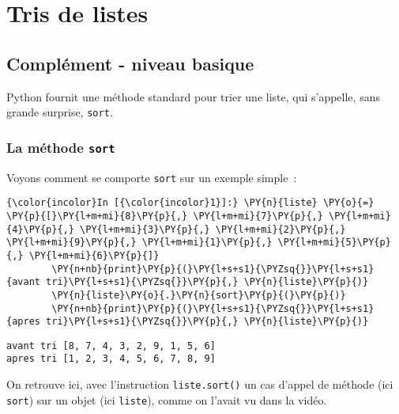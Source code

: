     \hypertarget{tris-de-listes}{%
\section{Tris de listes}\label{tris-de-listes}}

    \hypertarget{compluxe9ment---niveau-basique}{%
\subsection{Complément - niveau
basique}\label{compluxe9ment---niveau-basique}}

    Python fournit une méthode standard pour trier une liste, qui s'appelle,
sans grande surprise, \texttt{sort}.

    \hypertarget{la-muxe9thode-sort}{%
\subsubsection{\texorpdfstring{La méthode
\texttt{sort}}{La méthode sort}}\label{la-muxe9thode-sort}}

    Voyons comment se comporte \texttt{sort} sur un exemple simple~:

    \begin{Verbatim}[commandchars=\\\{\}]
{\color{incolor}In [{\color{incolor}1}]:} \PY{n}{liste} \PY{o}{=} \PY{p}{[}\PY{l+m+mi}{8}\PY{p}{,} \PY{l+m+mi}{7}\PY{p}{,} \PY{l+m+mi}{4}\PY{p}{,} \PY{l+m+mi}{3}\PY{p}{,} \PY{l+m+mi}{2}\PY{p}{,} \PY{l+m+mi}{9}\PY{p}{,} \PY{l+m+mi}{1}\PY{p}{,} \PY{l+m+mi}{5}\PY{p}{,} \PY{l+m+mi}{6}\PY{p}{]}
        \PY{n+nb}{print}\PY{p}{(}\PY{l+s+s1}{\PYZsq{}}\PY{l+s+s1}{avant tri}\PY{l+s+s1}{\PYZsq{}}\PY{p}{,} \PY{n}{liste}\PY{p}{)}
        \PY{n}{liste}\PY{o}{.}\PY{n}{sort}\PY{p}{(}\PY{p}{)}
        \PY{n+nb}{print}\PY{p}{(}\PY{l+s+s1}{\PYZsq{}}\PY{l+s+s1}{apres tri}\PY{l+s+s1}{\PYZsq{}}\PY{p}{,} \PY{n}{liste}\PY{p}{)}
\end{Verbatim}


    \begin{Verbatim}[commandchars=\\\{\}]
avant tri [8, 7, 4, 3, 2, 9, 1, 5, 6]
apres tri [1, 2, 3, 4, 5, 6, 7, 8, 9]

    \end{Verbatim}

    On retrouve ici, avec l'instruction \texttt{liste.sort()} un cas d'appel
de méthode (ici \texttt{sort}) sur un objet (ici \texttt{liste}), comme
on l'avait vu dans la vidéo.\\


